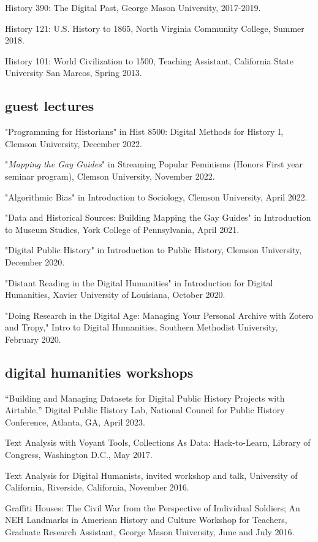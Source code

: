 \documentclass[11pt]{article}
\begin{document}
History 390: The Digital Past, George Mason University, 2017-2019.

History 121: U.S. History to 1865, North Virginia Community College, Summer 2018.

History 101: World Civilization to 1500, Teaching Assistant, California State University San Marcos, Spring 2013.

\subsection{guest lectures}
"Programming for Historians" in Hist 8500: Digital Methods for History I, Clemson University, December 2022.

"\emph{Mapping the Gay Guides}" in Streaming Popular Feminisms (Honors First year seminar program), Clemson University, November 2022. 

"Algorithmic Bias" in Introduction to Sociology, Clemson University, April 2022.

"Data and Historical Sources: Building Mapping the Gay Guides" in Introduction to Museum Studies, York College of Pennsylvania, April 2021.

"Digital Public History" in Introduction to Public History, Clemson University, December 2020.

"Distant Reading in the Digital Humanities" in Introduction for Digital Humanities, Xavier University of Louisiana, October 2020.

"Doing Research in the Digital Age: Managing Your Personal Archive with Zotero and Tropy," Intro to Digital Humanities, Southern Methodist University, February 2020.

\subsection{digital humanities workshops}
``Building and Managing Datasets for Digital Public History Projects with Airtable,'' Digital Public History Lab, National Council for Public History Conference, Atlanta, GA, April 2023.

Text Analysis with Voyant Tools, Collections As Data: Hack-to-Learn, Library of Congress, Washington D.C., May 2017.

Text Analysis for Digital Humanists, invited workshop and talk, University of California, Riverside, California, November 2016.

Graffiti Houses: The Civil War from the Perspective of Individual Soldiers; An NEH Landmarks in American History and Culture Workshop for Teachers, Graduate Research Assistant, George Mason University, June and July 2016.
\end{document}
